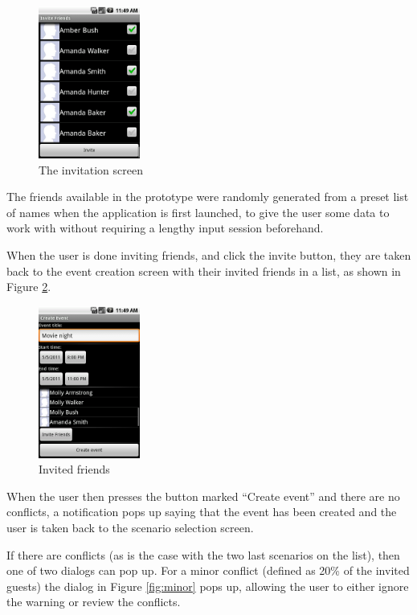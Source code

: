 \documentclass[]{report}
\begin{document}
\begin{figure}[htb]
  \centering
  \includegraphics[height=50mm]{invitation}
  \caption{The invitation screen}
  \label{fig:invitation}
\end{figure}

The friends available in the prototype were randomly generated from a preset
list of names when the application is first launched, to give the user some data
to work with without requiring a lengthy input session beforehand.

When the user is done inviting friends, and click the invite button, they are
taken back to the event creation screen with their invited friends in a list, as
shown in Figure \ref{fig:invited}.

\begin{figure}[htb]
  \centering
  \includegraphics[height=50mm]{invited}
  \caption{Invited friends}
  \label{fig:invited}
\end{figure}

When the user then presses the button marked ``Create event'' and there are no
conflicts, a notification pops up saying that the event has been created and the
user is taken back to the scenario selection screen.

If there are conflicts (as is the case with the two last scenarios on the list),
then one of two dialogs can pop up. For a minor conflict (defined as 20\% of the
invited guests) the dialog in Figure \ref{fig:minor} pops up, allowing the user
to either ignore the warning or review the conflicts.
\end{document}
